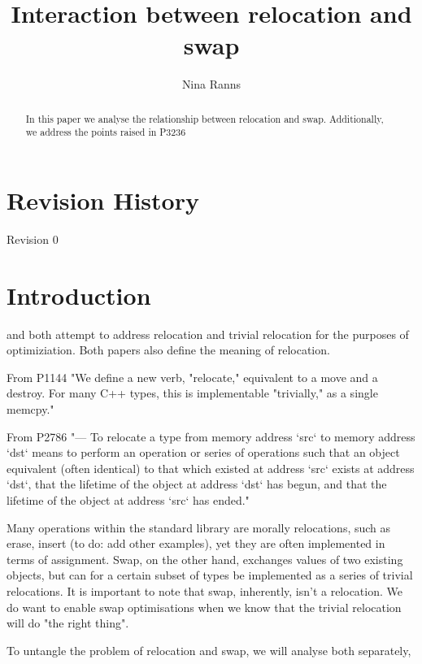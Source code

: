 \documentclass{wg21}
\title{Interaction between relocation and swap}
\author{Nina Ranns}{dinka.ranns@gmail.com}
\begin{document}
\maketitle

\begin{abstract}
\noindent
In this paper we analyse the relationship between relocation and swap.
Additionally, we address the points raised in P3236 %
\end{abstract}

\tableofcontents

\clearpage
\section*{Revision History}

Revision 0

\section{Introduction}

 and  both attempt to address relocation and trivial relocation for the purposes of optimiziation. Both papers also define the meaning of relocation.

From P1144
"We define a new verb, "relocate," equivalent to a move and a destroy. For many C++ types, this is implementable "trivially," as a single memcpy."

From P2786
"— To relocate a type from memory address `src` to memory address `dst` means to perform an operation or series of operations such that an object equivalent (often identical) to that which existed at address `src`
exists at address `dst`, that the lifetime of the object at address `dst` has begun, and that the lifetime of the
object at address `src` has ended."

Many operations within the standard library are morally relocations, such as erase, insert (to do: add other examples), yet they are often implemented in terms of assignment.
Swap, on the other hand, exchanges values of two existing objects, but can for a certain subset of types be implemented as a series of trivial relocations. It is important to note that swap, inherently, isn't a relocation. We do want to enable swap optimisations when we know that the trivial relocation will do "the right thing".

To untangle the problem of relocation and swap, we will analyse both separately,
\end{document}
